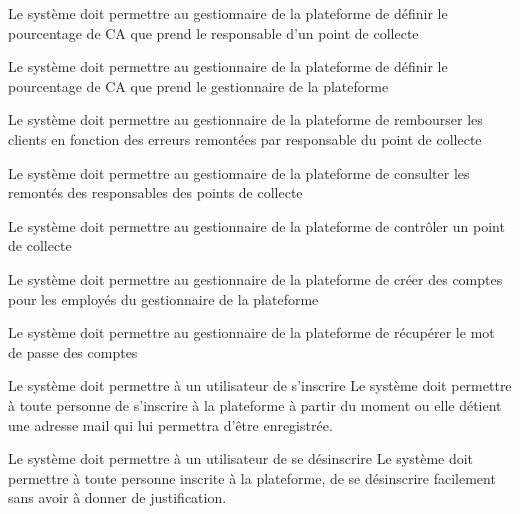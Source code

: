 \begin{reqs}{Le système doit permettre au gestionnaire de la plateforme de définir le pourcentage de CA que prend le responsable d'un point de collecte}
\end{reqs}

\begin{reqs}{Le système doit permettre au gestionnaire de la plateforme de définir le pourcentage de CA que prend le gestionnaire de la plateforme}
\end{reqs}

\begin{reqs}{Le système doit permettre au gestionnaire de la plateforme de rembourser les clients en fonction des erreurs remontées par responsable du point de collecte}
\end{reqs}

\begin{reqs}{Le système doit permettre au gestionnaire de la plateforme de consulter les remontés des responsables des points de collecte}
\end{reqs}

\begin{reqs}{Le système doit permettre au gestionnaire de la plateforme de contrôler un point de collecte}
\end{reqs}

\begin{reqs}{Le système doit permettre au gestionnaire de la plateforme de créer des comptes pour les employés du gestionnaire de la plateforme}
\end{reqs}

\begin{reqs}{Le système doit permettre au gestionnaire de la plateforme de récupérer le mot de passe des comptes}
\end{reqs}



\begin{reqs}{Le système doit permettre à un utilisateur de s'inscrire}
Le système doit permettre à toute personne de s'inscrire à la plateforme à partir du moment ou elle détient une adresse mail qui lui permettra d'être enregistrée.
\end{reqs}

\begin{reqs}{Le système doit permettre à un utilisateur de se désinscrire}
Le système doit permettre à toute personne inscrite à la plateforme, de se désinscrire facilement sans avoir à donner de justification.
\end{reqs}

